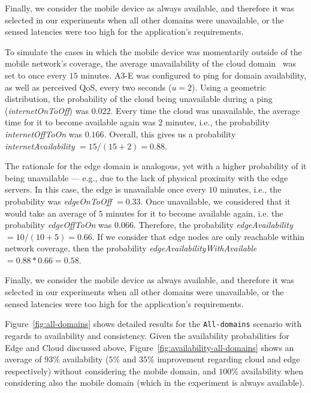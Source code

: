 Finally, we consider the mobile device as always available, and therefore it was selected in our experiments when all other domains were unavailable, or the sensed latencies were too high for the application's requirements.

To simulate the cases in which the mobile device was momentarily outside of the mobile network's coverage, the average unavailability of the cloud domain~\cite{garcia2017bandwidth} was set to once every $15$ minutes. A3-E was configured to ping for domain availability, as well as perceived QoS, every two seconds ($u = 2$). Using a geometric distribution, the probability of the cloud being unavailable during a ping (\textit{internetOnToOff}) was $0.022$. Every time the cloud was unavailable, the average time for it to become available again was $2$ minutes, i.e., the probability  \textit{internetOffToOn} was $0.166$. Overall, this gives us a probability \textit{internetAvailability} $=15/(15+2)=0.88$.


The rationale for the edge domain is analogous, yet with a higher probability of it being unavailable --- e.g., due to the lack of physical proximity with the edge servers. In this case, the edge is unavailable once every $10$ minutes, i.e., the probability was \textit{edgeOnToOff}  $ = 0.33$. Once unavailable, we considered that it would take an average of $5$ minutes for it to become available again, i.e. the probability \textit{edgeOffToOn} was $0.066$. Therefore, the probability \textit{edgeAvailability} $=10/(10+5)=0.66$. If we consider that edge nodes are only reachable within network coverage, then the probability \textit{edgeAvailabilityWithAvailable}$=0.88*0.66=0.58$.

Finally, we consider the mobile device as always available, and therefore it was selected in our experiments when all other domains were unavailable, or the sensed latencies were too high for the application's requirements.

Figure~\ref{fig:all-domains} shows detailed results for the \texttt{All-domains} scenario with regards to availability and consistency. 
Given the availability probabilities for Edge and Cloud discussed above, Figure~\ref{fig:availability-all-domains} shows an average of $93\%$ availability ($5\%$ and $35\%$ improvement regarding cloud and edge respectively) without considering the mobile domain, and $100\%$ availability when considering also the mobile domain (which in the experiment is always available). 

